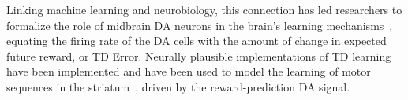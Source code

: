 Linking machine learning and neurobiology, this connection has led researchers to formalize the role of midbrain DA neurons in the brain's learning mechanisms~\cite{BartoAG:1994:TDLearning,MontaguePR:1996:Dopamine}, equating the firing rate of the DA cells with the amount of change in expected future reward, or TD Error.  Neurally plausible implementations of TD learning have been implemented and have been used to model the learning of motor sequences in the striatum~\cite{MontaguePR:1996:Dopamine}, driven by the reward-prediction DA signal.




\bigskip

